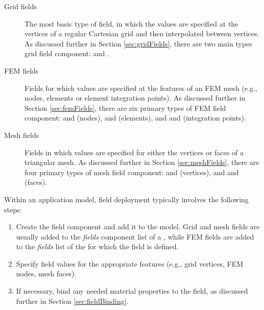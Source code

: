 \begin{description}

\item[Grid fields]\mbox{}

The most basic type of field, in which the values are specified at the
vertices of a regular Cartesian grid and then interpolated between
vertices. As discussed further in Section \ref{sec:gridFields}, there
are two main types grid field component:
 and
.

\item[FEM fields]\mbox{}

Fields for which values are specified at the features of an FEM mesh
(e.g., nodes, elements or element integration points).  As discussed
further in Section \ref{sec:femFields}, there are six primary types of
FEM field component:
and
(nodes),
and
(elements), and
and
(integration points).

\item[Mesh fields]\mbox{}

Fields in which values are specified for either the vertices or faces
of a triangular mesh. As discussed
further in Section \ref{sec:meshFields}, there are four primary types of
mesh field component:
and
(vertices), and 
and
(faces).

\end{description}

Within an application model, field deployment typically involves the
following steps:

\begin{enumerate}

\item Create the field component and add it to the model. Grid and
mesh fields are usually added to the {\it fields} component list of a
, while FEM fields are
added to the {\it fields} list of the
 for which the field
is defined.

\item Specify field values for the appropriate features (e.g.,
grid vertices, FEM nodes, mesh faces).

\item If necessary, bind any needed material properties
to the field, as discussed further in Section \ref{sec:fieldBinding}.

\end{enumerate}


